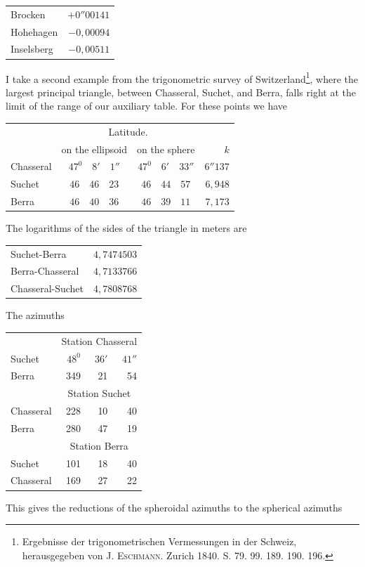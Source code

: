%
\begin{center}
\begin{tabular}{lr}
Brocken&\(+0''00141\)\\
Hohehagen&\(-0{,}00094\)\\
Inselsberg&\(-0{,}00511\)
\end{tabular}
\end{center}
\hspace*{\parindent}I take a second example from the trigonometric survey of Switzerland\footnote{Ergebnisse der trigonometrischen Vermessungen in der Schweiz, herausgegeben von J. \textsc{Eschmann}. Zurich 1840. S. 79. 99. 189. 190. 196.}, where the largest principal triangle, between Chasseral, Suchet, and Berra, falls right at the limit of the range of our auxiliary table. For these points we have
\begin{center}
\begin{tabular}{l|c|c|r}
&\multicolumn{2}{c|}{Latitude.}&\\
&on the ellipsoid&on the sphere&\(k\)\\\hline
Chasseral&\(47^0\quad8'\quad1''\)&\(47^0\quad6'\quad33''\)&\(6''137\)\\
Suchet&\(46\quad46\quad23\)&\(46\quad44\quad57\)&\(6{,}948\)\\
Berra&\(46\quad40\quad36\)&\(46\quad39\quad11\)&\(7{,}173\)
\end{tabular}
\end{center}
The logarithms of the sides of the triangle in meters are
\begin{center}
\begin{tabular}{lr}
Suchet-Berra&\(4{,}7474503\)\\
Berra-Chasseral&\(4{,}7133766\)\\
Chasseral-Suchet&\(4{,}7808768\)
\end{tabular}
\end{center}
The azimuths
\begin{center}
\begin{tabular}{lrrr}
&\multicolumn{3}{c}{Station Chasseral}\\
Suchet&\(48^0\)&\(36'\)&\(41''\)\\
Berra&349&21&54\\
&\multicolumn{3}{c}{Station Suchet}\\
Chasseral&228&10&40\\
Berra&280&47&19\\
&\multicolumn{3}{c}{Station Berra}\\
Suchet&101&18&40\\
Chasseral&169&27&22
\end{tabular}
\end{center}
\hspace*{\parindent}This gives the reductions of the spheroidal azimuths to the spherical azimuths
